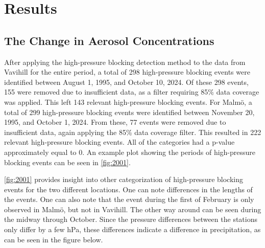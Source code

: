 \newpage
\section{Results}
\subsection{The Change in Aerosol Concentrations}
After applying the high-pressure blocking detection method to the data from Vavihill for the entire period, a total of 298 high-pressure blocking events were identified between August 1, 1995, and October 10, 2024. Of these 298 events, 155 were removed due to insufficient \PM  data, as a filter requiring 85\% data coverage was applied. This left 143 relevant high-pressure blocking events. For Malmö, a total of 299 high-pressure blocking events were identified between November 20, 1995, and October 1, 2024. From these, 77 events were removed due to insufficient \PM  data, again applying the 85\% data coverage filter. This resulted in 222 relevant high-pressure blocking events. All of the categories had a p-value approximately equal to 0. An example plot showing the periods of high-pressure blocking events can be seen in \autoref{fig:2001}.


\autoref{fig:2001} provides insight into other categorization of high-pressure blocking events for the two different locations. One can note differences in the lengths of the events. One can also note that the event during the first of February is only observed in Malmö, but not in Vavihill. The other way around can be seen during the midway through October. Since the pressure differences between the stations only differ by a few hPa, these differences indicate a difference in precipitation, as can be seen in the figure below. 

